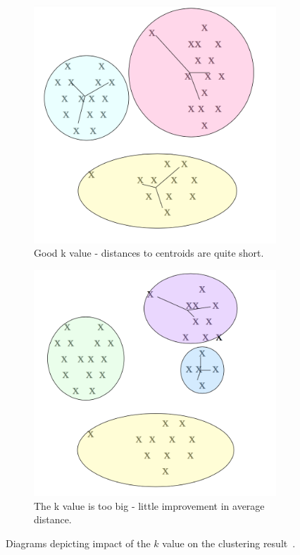 \begin{figure}[b]
\begin{subfigure}[t]{0.30\textwidth}
                \includegraphics[width=\textwidth]{Figures/justright}
                \caption{Good k value - distances to centroids are quite short.}
                \label{fig:justright}
        \end{subfigure}
         \begin{subfigure}[t]{0.30\textwidth}
                \includegraphics[width=\textwidth]{Figures/overfitting}
                \caption{The k value is too big - little improvement in average distance.}
                \label{fig:overfitting}
        \end{subfigure}
          \caption{Diagrams depicting impact of the $k$ value on the clustering result~\cite{kcluster}.}
        \label{fig:kmeansclustering}
\end{figure}

